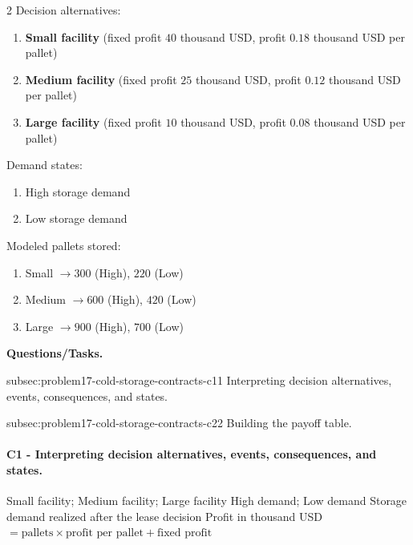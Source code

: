 	\begin{multicols}{2}
		Decision alternatives:
		\begin{enumerate}[label=\arabic*.]
			\item \textbf{Small facility} (fixed profit $40$ thousand USD, profit $0.18$ thousand USD per pallet)
			\item \textbf{Medium facility} (fixed profit $25$ thousand USD, profit $0.12$ thousand USD per pallet)
			\item \textbf{Large facility} (fixed profit $10$ thousand USD, profit $0.08$ thousand USD per pallet)
		\end{enumerate}

		Demand states:
		\begin{enumerate}[label=\arabic*.]
			\item High storage demand
			\item Low storage demand
		\end{enumerate}

			\columnbreak

		Modeled pallets stored:
		\begin{enumerate}[label=\arabic*.]
			\item Small $\to 300$ (High), $220$ (Low)
			\item Medium $\to 600$ (High), $420$ (Low)
			\item Large $\to 900$ (High), $700$ (Low)
		\end{enumerate}
	\end{multicols}

	\textbf{Questions/Tasks.}
	\begin{enumerate}
		\CriterionTask
		{subsec:problem17-cold-storage-contracts-c1}{1}
		{Interpreting decision alternatives, events, consequences, and states.}

		\CriterionTask
		{subsec:problem17-cold-storage-contracts-c2}{2}
		{Building the payoff table.}
	\end{enumerate}

	\paragraph*{C1 - Interpreting decision alternatives, events, consequences, and states.}
	\label{subsec:problem17-cold-storage-contracts-c1}
	\DecisionElementsTable
	{Small facility; Medium facility; Large facility}
	{High demand; Low demand}
	{Storage demand realized after the lease decision}
	{Profit in thousand USD $= \text{pallets} \times \text{profit per pallet} + \text{fixed profit}$}

